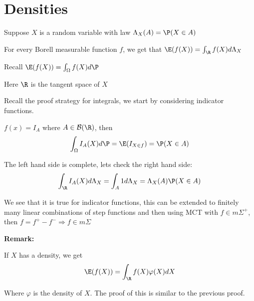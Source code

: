 \section{Densities}
\noindent Suppose $X$ is a random variable with law $\Lambda_X(A) = \P(X\in A)$
\par\bigskip
\begin{theo}[]{}
  For every Borell measurable function $f$, we get that $\E(f(X)) = \int_\R f(X)d\Lambda_X$\par
  \noindent Recall $\E(f(X)) = \int_{\Omega}f(X)d\P$
\end{theo}\par
\noindent Here $\R$ is the tangent space of $X$\par
\noindent Recall the proof strategy for integrals, we start by considering indicator functions.
\par\bigskip
\begin{prf}[]{}
  $f(x) = I_A$ where $A\in\mathcal{B}(\R)$, then
  \begin{equation*}
    \begin{gathered}
      \int_{\Omega}I_A(X)d\P = \E(I_{X\in f}) = \P(X\in A)
    \end{gathered}
  \end{equation*}\par
  \noindent The left hand side is complete, lets check the right hand side:
  \begin{equation*}
    \begin{gathered}
      \int_\R I_A(X)d\Lambda_X = \int_A1d\Lambda_X = \Lambda_X(A)\P(X\in A)
    \end{gathered}
  \end{equation*}
  \par\bigskip
  \noindent We see that it is true for indicator functions, this can be extended to finitely many linear combinations of step functions and then using MCT with $f\in m\Sigma^+$, then $f = f^+-f^-\Rightarrow f\in m\Sigma$
\end{prf}
\par\bigskip
\noindent\textbf{Remark:}\par
\noindent If $X$ has a density, we get 
\begin{equation*}
  \begin{gathered}
    \E(f(X)) = \int_\R f(X)\varphi(X)dX
  \end{gathered}
\end{equation*}\par
\noindent Where $\varphi$ is the density of $X$. The proof of this is similar to the previous proof.
